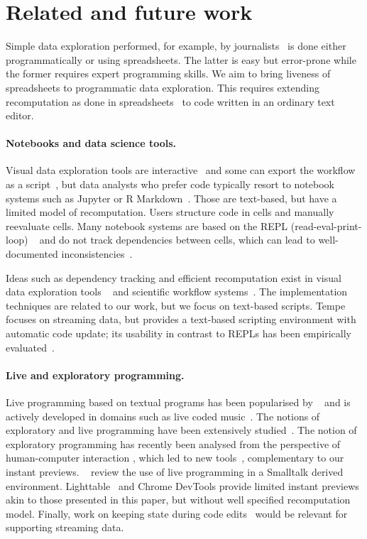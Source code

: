 \documentclass[english,crc,references=cleveref]{programming}
\theoremstyle{plain}
\theoremstyle{definition}
\begin{document}

\section{Related and future work}
\label{sec:future}

Simple data exploration performed, for example, by journalists~\cite{ddj} is done either
programmatically or using spreadsheets. The latter is easy but error-prone while the former
requires expert programming skills. We aim to bring liveness of spreadsheets to programmatic
data exploration. This requires extending recomputation as done in spreadsheets~\cite{spreadsheet}
to code written in an ordinary text editor.

\paragraph{Notebooks and data science tools.}
Visual data exploration tools are interactive~\cite{control,tableau,vizdom} and some
can export the workflow as a script~\cite{wrangler}, but data analysts who prefer code
typically resort to notebook systems such as Jupyter or R Markdown~\cite{jupyter,rmarkdown}.
Those are text-based, but have a limited model of recomputation. Users structure code in
cells and manually reevaluate cells. Many notebook systems are based on the REPL (read-eval-print-loop)%
~\cite{lisp,drscheme} and do not track dependencies between cells, which can lead to well-documented
inconsistencies~\cite{dataflow,noworkflow,wrattler}.

Ideas such as dependency tracking and efficient recomputation exist in visual data exploration tools%
~\cite{control,tableau,vizdom} and scientific workflow systems~\cite{taverna,kepler}. The
implementation techniques are related to our work, but we focus on text-based scripts.
Tempe~\cite{tempe} focuses on streaming data, but provides a text-based scripting environment
with automatic code update; its usability in contrast to REPLs has been empirically
evaluated~\cite{ripple}.

\paragraph{Live and exploratory programming.}
Live programming based on textual programs has been popularised by \citeauthor{learnable}~\cite{learnable,principle} and
is actively developed in domains such as live coded music~\cite{beyond,sonic}.
The notions of exploratory and live programming have been extensively studied~\cite{review}.
The notion of exploratory programming has recently been analysed from the perspective of
human-computer interaction \cite{exploratory}, which led to new tools~\cite{variolite},
complementary to our instant previews. ~\cite{liveroad}
review the use of live programming in a Smalltalk derived environment. Lighttable~\cite{lighttable}
and Chrome DevTools provide limited instant previews akin to those presented in this paper,
but without well specified recomputation model. Finally, work on keeping state during
code edits~\cite{alive,livingit} would be relevant for supporting streaming data.
\end{document}
